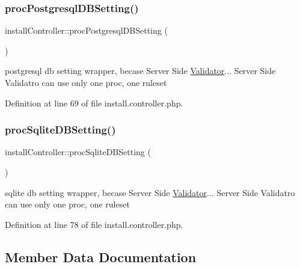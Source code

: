 \hypertarget{classinstallController_afc3f4c6259e4be427531fca748c98c49}{}\label{classinstallController_afc3f4c6259e4be427531fca748c98c49} 
\subsubsection{\texorpdfstring{proc\+Postgresql\+D\+B\+Setting()}{procPostgresqlDBSetting()}}
{\footnotesize\ttfamily install\+Controller\+::proc\+Postgresql\+D\+B\+Setting (\begin{DoxyParamCaption}{ }\end{DoxyParamCaption})}



postgresql db setting wrapper, becase Server Side \hyperlink{classValidator}{Validator}... Server Side Validatro can use only one proc, one ruleset 



Definition at line 69 of file install.\+controller.\+php.

\hypertarget{classinstallController_ad850902e30ecd8f0d80f82579f1f867f}{}\label{classinstallController_ad850902e30ecd8f0d80f82579f1f867f} 
\subsubsection{\texorpdfstring{proc\+Sqlite\+D\+B\+Setting()}{procSqliteDBSetting()}}
{\footnotesize\ttfamily install\+Controller\+::proc\+Sqlite\+D\+B\+Setting (\begin{DoxyParamCaption}{ }\end{DoxyParamCaption})}



sqlite db setting wrapper, becase Server Side \hyperlink{classValidator}{Validator}... Server Side Validatro can use only one proc, one ruleset 



Definition at line 78 of file install.\+controller.\+php.



\subsection{Member Data Documentation}
\hypertarget{classinstallController_a1d32cf378279cb2b7d388b8a7e88c7aa}{}\label{classinstallController_a1d32cf378279cb2b7d388b8a7e88c7aa} 
